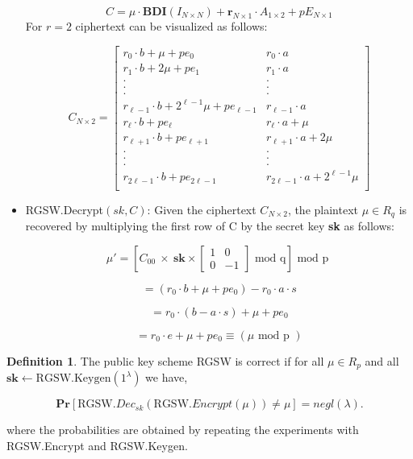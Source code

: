 \documentclass[10pt,journal,compsoc]{IEEEtran}
\theoremstyle{definition}
\newtheorem{definition}{Definition}[section]
\begin{document}
\begin{itemize}
$$C = \mu\cdot\textbf{BDI}\left( I_{N\times N} \right) + \textbf{r}_{N\times 1}\cdot A_{1\times 2} + pE_{N\times 1}$$
For $r=2$ ciphertext can be visualized as follows:

\[
C_{N\times 2} =
  \begin{bmatrix}
    r_0\cdot b + \mu + pe_0 & r_0\cdot a \\
    r_1\cdot b + 2\mu + pe_1 & r_1\cdot a \\
    . & .\\
    . & .\\
    . & .\\
    r_{\ell -1}\cdot b + 2^{\ell -1}\mu + pe_{\ell -1} &  r_{\ell -1}\cdot a\\
     r_{\ell}\cdot b + pe_{\ell} & r_{\ell}\cdot a + \mu\\
     r_{\ell + 1}\cdot b + pe_{\ell + 1} & r_{\ell + 1}\cdot a + 2\mu\\
      . & .\\
    . & .\\
    . & .\\
     r_{2\ell - 1}\cdot b + pe_{2\ell - 1} & r_{2\ell - 1}\cdot a + 2^{\ell - 1}\mu\\
  \end{bmatrix}
\]


\item RGSW.Decrypt$\left(sk, C\right)$:  Given the ciphertext $C_{N \times 2}$, the plaintext $\mu \in R_q$ is recovered by multiplying the first row of C by the secret key \textbf{sk} as follows:

$${\mu}' = \left[ C_{00} \ \times \ \textbf{sk} \times
\left[ 
\begin{smallmatrix} 
1 & 0\\
0 & -1  
\end{smallmatrix}
\right]
\textrm{ mod q}\right] \textrm{ mod p }
$$

$$= \left( r_0\cdot b + \mu + pe_0 \right) - r_0\cdot a \cdot s $$

$$=  r_0\cdot \left(b - a\cdot s\right) + \mu + pe_0 $$

$$=  r_0\cdot e + \mu + pe_0 \equiv \left( \mu \textrm{ mod p } \right) $$

\end{itemize}

\begin{definition}

The public key scheme RGSW is correct if for all $\mu \in R_p$ and all $\textbf{sk} \leftarrow \textrm{RGSW.Keygen}\left( 1^\lambda\right)$ we have,

$$\textbf{Pr}\left[ \textrm{RGSW.}Dec_{sk}\left( \textrm{RGSW.}Encrypt\left( \mu\right)\right) \neq \mu \right] = negl\left(\lambda\right).$$

where the probabilities are obtained by repeating the experiments with RGSW.Encrypt and RGSW.Keygen. 

\end{definition}
\end{document}
